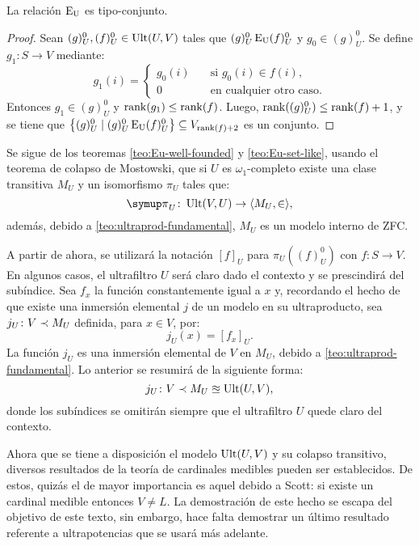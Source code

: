 \documentclass
[
  12pt,
  letterpaper,
  openany,
  oneside,
]{book}
\begin{document}
\begin{teo}\label{teo:Eu-set-like}
    La relación $\operatorname{E_U}$ es tipo-conjunto.
\end{teo}
\begin{proof}
    \def\Ou{^0_U}
    Sean $(g)\Ou, (f)\Ou\in \Ult(U,V)$ tales que $(g)\Ou \Eu (f)\Ou$ y $g_0\in(g)\Ou$.
    Se define $g_1\colon S\to V$ mediante:
    \[
        g_1(i) =
        \begin{cases}
          g_0(i)\quad & \text{si $g_0(i)\in f(i)$,}\\
          0\quad & \text{en cualquier otro caso.}
        \end{cases}
    \]
    Entonces $g_1\in (g)\Ou$ y $\operatorname{rank}(g_1)\leq\operatorname{rank}(f)$. Luego, $\rank((g)\Ou)\leq\rank(f)+1$,
    y se tiene que $\set{(g)\Ou\mid (g)\Ou\Eu (f)\Ou}\subseteq V_{\rank(f)+2}$ es un conjunto.
\end{proof}

Se sigue de los teoremas \ref{teo:Eu-well-founded} y \ref{teo:Eu-set-like},
usando el teorema de colapso de Mostowski, que si $U$ es $\omega_1$-completo
existe una clase transitiva $M_U$ y un isomorfismo $\pi_U$ tales que:
\[
    \pi_U\colon\Ult(V,U)\to\op{M_U,\in},
\]
además, debido a \ref{teo:ultraprod-fundamental}, $M_U$ es un modelo interno
de ZFC.

A partir de ahora, se utilizará la notación $[f]_U$ para $\pi_U((f)_U^0)$
con $f\colon S\to V$. En algunos casos, el ultrafiltro $U$ será claro dado el contexto
y se prescindirá del subíndice. Sea $f_x$ la función constantemente igual a $x$ y,
recordando el hecho de que existe una inmersión elemental $j$ de un modelo en su ultraproducto,
sea $j_U\colon V\prec M_U$ definida, para $x\in V$, por:
\[
    j_U(x) = [f_x]_U.
\]
La función $j_U$ es una inmersión elemental de $V$ en $M_U$, debido a \ref{teo:ultraprod-fundamental}.
Lo anterior se resumirá de la siguiente forma:
\[
    j_U\colon V\prec M_U\approxeq\operatorname{Ult}(U,V),
\]
donde los subíndices se omitirán siempre que el ultrafiltro $U$ quede claro
del contexto.

Ahora que se tiene a disposición el modelo $\operatorname{Ult}(U,V)$ y su colapso transitivo,
diversos resultados de la teoría de cardinales medibles pueden ser establecidos.
De estos, quizás el de mayor importancia es aquel debido a Scott: si existe
un cardinal medible entonces $V\neq L$. La demostración de este hecho se
escapa del objetivo de este texto, sin embargo, hace falta demostrar un
último resultado referente a ultrapotencias que se usará más adelante.
\end{document}
